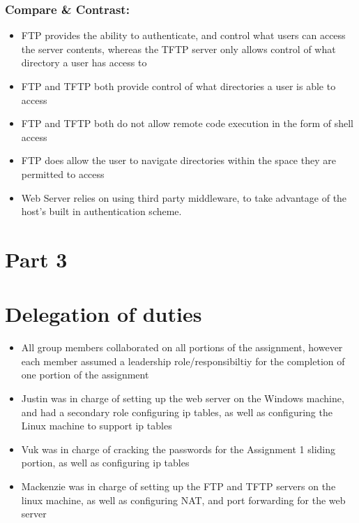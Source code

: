 \documentclass[11pt]{article}
\begin{document}
\subsubsection{Compare \& Contrast:}
\label{sec-3-2-4}
\begin{itemize}
\item FTP provides the ability to authenticate, and control what users can access
the server contents, whereas the TFTP server only allows control of what
directory a user has access to
\item FTP and TFTP both provide control of what directories a user is able to access
\item FTP and TFTP both do not allow remote code execution in the form of shell access
\item FTP does allow the user to navigate directories within the space they are
permitted to access
\item Web Server relies on using third party middleware, to take advantage of the 
host's built in authentication scheme.
\end{itemize}

\section{Part 3}
\label{sec-4}

\section{Delegation of duties}
\label{sec-5}
\begin{itemize}
\item All group members collaborated on all portions of the assignment, however
each member assumed a leadership role/responsibiltiy for the completion of
one portion of the assignment
\item Justin was in charge of setting up the web server on the Windows machine,
and had a secondary role configuring ip tables, as well as configuring the
Linux machine to support ip tables
\item Vuk was in charge of cracking the passwords for the Assignment 1 sliding
portion, as well as configuring ip tables
\item Mackenzie was in charge of setting up the FTP and TFTP servers on the linux
machine, as well as configuring NAT, and port forwarding for the web server
\end{itemize}
\end{document}
